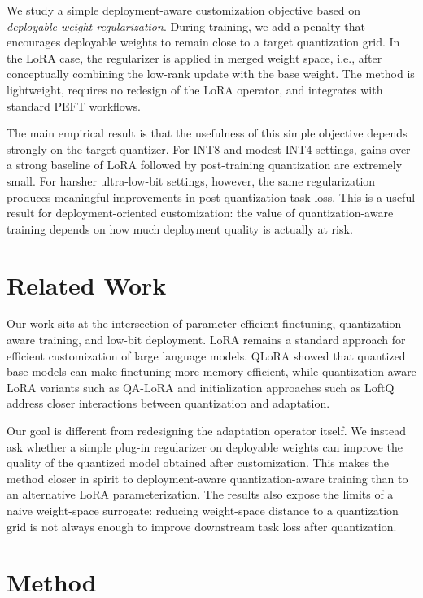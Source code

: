 \documentclass[11pt]{article}
\begin{document}
We study a simple deployment-aware customization objective based on \emph{deployable-weight regularization}. During training, we add a penalty that encourages deployable weights to remain close to a target quantization grid. In the LoRA case, the regularizer is applied in merged weight space, i.e., after conceptually combining the low-rank update with the base weight. The method is lightweight, requires no redesign of the LoRA operator, and integrates with standard PEFT workflows.

The main empirical result is that the usefulness of this simple objective depends strongly on the target quantizer. For INT8 and modest INT4 settings, gains over a strong baseline of LoRA followed by post-training quantization are extremely small. For harsher ultra-low-bit settings, however, the same regularization produces meaningful improvements in post-quantization task loss. This is a useful result for deployment-oriented customization: the value of quantization-aware training depends on how much deployment quality is actually at risk.

\section{Related Work}

Our work sits at the intersection of parameter-efficient finetuning, quantization-aware training, and low-bit deployment. LoRA \citep{hu2022lora} remains a standard approach for efficient customization of large language models. QLoRA \citep{dettmers2023qlora} showed that quantized base models can make finetuning more memory efficient, while quantization-aware LoRA variants such as QA-LoRA \citep{xu2024qalora} and initialization approaches such as LoftQ \citep{li2024loftq} address closer interactions between quantization and adaptation.

Our goal is different from redesigning the adaptation operator itself. We instead ask whether a simple plug-in regularizer on deployable weights can improve the quality of the quantized model obtained after customization. This makes the method closer in spirit to deployment-aware quantization-aware training than to an alternative LoRA parameterization. The results also expose the limits of a naive weight-space surrogate: reducing weight-space distance to a quantization grid is not always enough to improve downstream task loss after quantization.

\section{Method}
\end{document}
